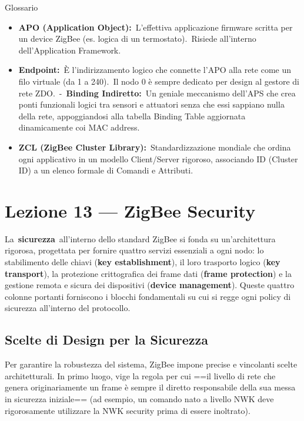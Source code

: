 \documentclass[
  italian,
  openany]{book}
\begin{document}
\begin{calloutnote}{Glossario}

\begin{itemize}
\item
  \textbf{APO (Application Object):}~L'effettiva applicazione firmware
  scritta per un device ZigBee (es. logica di un termostato).~Risiede
  all'interno dell'Application Framework.
\item
  \textbf{Endpoint:}~È l'indirizzamento logico che connette l'APO alla
  rete come un filo virtuale (da 1 a 240).~Il nodo 0 è sempre dedicato
  per design al gestore di rete ZDO.~-~\textbf{Binding Indiretto:}~Un
  geniale meccanismo dell'APS che crea ponti funzionali logici tra
  sensori e attuatori senza che essi sappiano nulla della rete,
  appoggiandosi alla tabella Binding Table aggiornata dinamicamente coi
  MAC address.~
\item
  \textbf{ZCL (ZigBee Cluster Library):}~Standardizzazione mondiale che
  ordina ogni applicativo in un modello Client/Server rigoroso,
  associando ID (Cluster ID) a un elenco formale di Comandi e Attributi.
\end{itemize}

\end{calloutnote}

\newpage

\chapter{Lezione 13 --- ZigBee
Security}\label{lezione-13-zigbee-security}

La~\textbf{sicurezza}~all'interno dello standard ZigBee si fonda su
un'architettura rigorosa, progettata per fornire quattro servizi
essenziali a ogni nodo: lo stabilimento delle chiavi (\textbf{key
establishment}), il loro trasporto logico (\textbf{key transport}), la
protezione crittografica dei frame dati (\textbf{frame protection}) e la
gestione remota e sicura dei dispositivi (\textbf{device management}).
Queste quattro colonne portanti forniscono i blocchi fondamentali su cui
si regge ogni policy di sicurezza all'interno del protocollo.

\section{Scelte di Design per la
Sicurezza}\label{scelte-di-design-per-la-sicurezza}

Per garantire la robustezza del sistema, ZigBee impone precise e
vincolanti scelte architetturali. In primo luogo, vige la regola per cui
==il livello di rete che genera originariamente un frame è sempre il
diretto responsabile della sua messa in sicurezza iniziale== (ad
esempio, un comando nato a livello NWK deve rigorosamente utilizzare la
NWK security prima di essere inoltrato).
\end{document}
